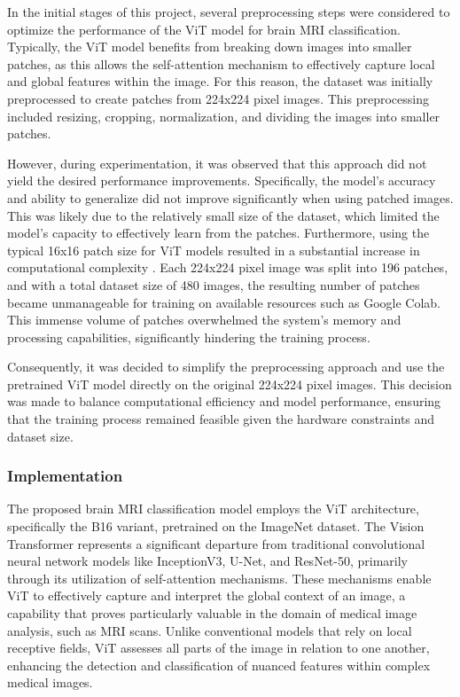 In the initial stages of this project, several preprocessing steps were considered to optimize the performance of the ViT model for brain MRI classification. Typically, the ViT model benefits from breaking down images into smaller patches, as this allows the self-attention mechanism to effectively capture local and global features within the image. For this reason, the dataset was initially preprocessed to create patches from 224x224 pixel images. This preprocessing included resizing, cropping, normalization, and dividing the images into smaller patches.

However, during experimentation, it was observed that this approach did not yield the desired performance improvements. Specifically, the model's accuracy and ability to generalize did not improve significantly when using patched images. This was likely due to the relatively small size of the dataset, which limited the model's capacity to effectively learn from the patches. Furthermore, using the typical 16x16 patch size for ViT models resulted in a substantial increase in computational complexity \cite{Wang2021Not}. Each 224x224 pixel image was split into 196 patches, and with a total dataset size of 480 images, the resulting number of patches became unmanageable for training on available resources such as Google Colab. This immense volume of patches overwhelmed the system's memory and processing capabilities, significantly hindering the training process.

Consequently, it was decided to simplify the preprocessing approach and use the pretrained ViT model directly on the original 224x224 pixel images. This decision was made to balance computational efficiency and model performance, ensuring that the training process remained feasible given the hardware constraints and dataset size.


\subsubsection{Implementation}

The proposed brain MRI classification model employs the ViT architecture, specifically the B16 variant, pretrained on the ImageNet dataset. The Vision Transformer represents a significant departure from traditional convolutional neural network models like InceptionV3, U-Net, and ResNet-50, primarily through its utilization of self-attention mechanisms. These mechanisms enable ViT to effectively capture and interpret the global context of an image, a capability that proves particularly valuable in the domain of medical image analysis, such as MRI scans. Unlike conventional models that rely on local receptive fields, ViT assesses all parts of the image in relation to one another, enhancing the detection and classification of nuanced features within complex medical images.

